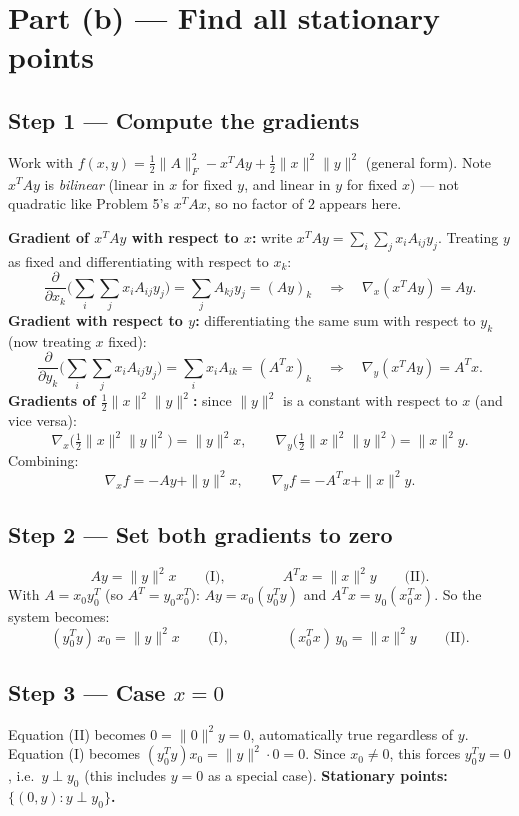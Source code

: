 \documentclass[11pt]{article}
\begin{document}
\section*{Part (b) --- Find all stationary points}

\subsection*{Step 1 --- Compute the gradients}

Work with $f(x,y) = \tfrac12\|A\|_F^2 - x^TAy+\tfrac12\|x\|^2\|y\|^2$ (general form). Note $x^TAy$ is \emph{bilinear} (linear in $x$ for fixed $y$, and linear in $y$ for fixed $x$) --- not quadratic like Problem 5's $x^TAx$, so no factor of $2$ appears here.

\textbf{Gradient of $x^TAy$ with respect to $x$:} write $x^TAy=\sum_i\sum_jx_iA_{ij}y_j$. Treating $y$ as fixed and differentiating with respect to $x_k$:
\[
\frac{\partial}{\partial x_k}\Big(\sum_i\sum_jx_iA_{ij}y_j\Big) = \sum_j A_{kj}y_j = (Ay)_k \quad\Longrightarrow\quad \nabla_x(x^TAy) = Ay.
\]
\textbf{Gradient with respect to $y$:} differentiating the same sum with respect to $y_k$ (now treating $x$ fixed):
\[
\frac{\partial}{\partial y_k}\Big(\sum_i\sum_jx_iA_{ij}y_j\Big) = \sum_i x_iA_{ik} = (A^Tx)_k \quad\Longrightarrow\quad \nabla_y(x^TAy) = A^Tx.
\]
\textbf{Gradients of $\tfrac12\|x\|^2\|y\|^2$:} since $\|y\|^2$ is a constant with respect to $x$ (and vice versa):
\[
\nabla_x\big(\tfrac12\|x\|^2\|y\|^2\big) = \|y\|^2x, \qquad \nabla_y\big(\tfrac12\|x\|^2\|y\|^2\big) = \|x\|^2y.
\]
Combining:
\[
\nabla_xf = -Ay+\|y\|^2x, \qquad \nabla_yf = -A^Tx+\|x\|^2y.
\]

\subsection*{Step 2 --- Set both gradients to zero}

\[
Ay = \|y\|^2x \qquad\text{(I)}, \qquad\qquad A^Tx = \|x\|^2y \qquad\text{(II)}.
\]
With $A=x_0y_0^T$ (so $A^T=y_0x_0^T$): $Ay = x_0(y_0^Ty)$ and $A^Tx=y_0(x_0^Tx)$. So the system becomes:
\[
(y_0^Ty)\,x_0 = \|y\|^2x \qquad\text{(I)}, \qquad\qquad (x_0^Tx)\,y_0 = \|x\|^2y \qquad\text{(II)}.
\]

\subsection*{Step 3 --- Case $x=0$}

Equation (II) becomes $0 = \|0\|^2y = 0$, automatically true regardless of $y$. Equation (I) becomes $(y_0^Ty)x_0 = \|y\|^2\cdot 0 = 0$. Since $x_0\ne0$, this forces $y_0^Ty=0$, i.e.\ $y\perp y_0$ (this includes $y=0$ as a special case). \textbf{Stationary points: $\{(0,y): y\perp y_0\}$.}
\end{document}
